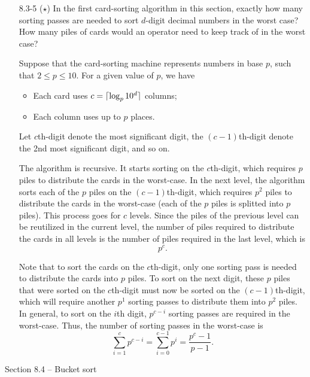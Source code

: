 \begin{enumerate}
\newpage

\item[8.3-5]{($\star$) In the first card-sorting algorithm in this section,
exactly how many sorting passes are needed to sort $d$-digit decimal numbers in
the worst case? How many piles of cards would an operator need to keep track of
in the worst case?}

\begin{framed}
Suppose that the card-sorting machine represents numbers in base $p$, such
that $2 \le p \le 10$. For a given value of $p$, we have
\begin{itemize}
  \item Each card uses $c = \lceil\log_p 10^d\rceil$ columns;
  \item Each column uses up to $p$ places.
\end{itemize}

Let $c$th-digit denote the most significant digit, the $(c - 1)$th-digit
denote the 2nd most significant digit, and so on.

The algorithm is recursive. It starts sorting on the $c$th-digit, which
requires $p$ piles to distribute the cards in the worst-case. In the next level,
the algorithm sorts each of the $p$ piles on the $(c - 1)$th-digit, which
requires $p^2$ piles to distribute the cards in the worst-case (each of the
$p$ piles is splitted into $p$ piles). This process goes for $c$ levels. Since
the piles of the previous level can be reutilized in the current level, the
number of piles required to distribute the cards in all levels is the number of
piles required in the last level, which is
\[
  p^c.
\]

Note that to sort the cards on the $c$th-digit, only one sorting pass is needed
to distribute the cards into $p$ piles. To sort on the next digit, these $p$
piles that were sorted on the $c$th-digit must now be sorted on the
$(c - 1)$th-digit, which will require another $p^1$ sorting passes to distribute
them into $p^2$ piles. In general, to sort on the $i$th digit, $p^{c - i}$
sorting passes are required in the worst-case. Thus, the number of sorting
passes in the worst-case is
\[
  \sum_{i = 1}^{c} p^{c - i} = \sum_{i = 0}^{c - 1} p^{i} = \frac{p^c - 1}{p - 1}.
\]

\end{framed}

\end{enumerate}

\newpage

{\large Section 8.4 {--} Bucket sort}

